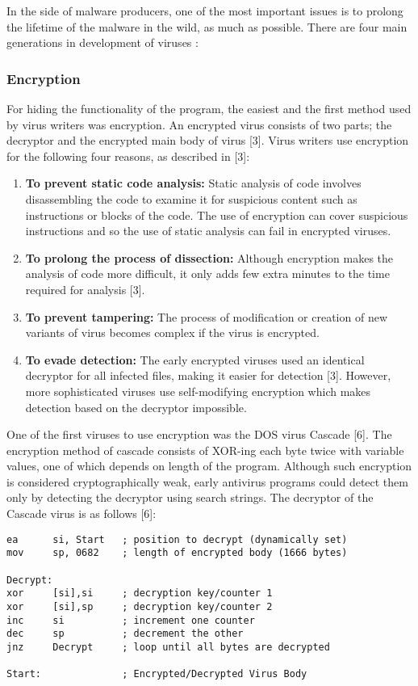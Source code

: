 In the side of malware producers, one of the most important issues is to prolong the lifetime of the malware in the wild, as much as possible. There are four main generations in development of viruses :

\subsubsection{Encryption}
For hiding the functionality of the program, the easiest and the first method used by virus writers was encryption. An encrypted virus consists of two parts; the decryptor and the encrypted main body of virus [3]. Virus writers use encryption for the following four reasons, as described in [3]: 
\begin{enumerate}
\item \textbf{To prevent static code analysis:} Static analysis of code involves disassembling the code to examine it for suspicious content such as instructions or blocks of the code. The use of encryption can cover suspicious instructions and so the use of static analysis can fail in encrypted viruses.
\item \textbf{To prolong the process of dissection:} Although encryption makes the analysis of code more difficult, it only adds few extra minutes to the time required for analysis [3]. 
\item \textbf{To prevent tampering:} The process of modification or creation of new variants of virus becomes complex if the virus is encrypted.
\item \textbf{To evade detection:} The early encrypted viruses used an identical decryptor for all infected files, making it easier for detection [3]. However, more sophisticated viruses use self-modifying encryption which makes detection based on the decryptor impossible.
\end{enumerate}

One of the first viruses to use encryption was the DOS virus Cascade [6]. The encryption method of cascade consists of XOR-ing each byte twice with variable values, one of which depends on length of the program. Although such encryption is considered cryptographically weak, early antivirus programs could detect them only by detecting the decryptor using search strings. The decryptor of the Cascade virus is as follows [6]:

\begin{verbatim}
ea      si, Start   ; position to decrypt (dynamically set)
mov     sp, 0682    ; length of encrypted body (1666 bytes)

Decrypt:
xor     [si],si     ; decryption key/counter 1
xor     [si],sp     ; decryption key/counter 2
inc     si          ; increment one counter
dec     sp          ; decrement the other
jnz     Decrypt     ; loop until all bytes are decrypted

Start: 	            ; Encrypted/Decrypted Virus Body
\end{verbatim}

